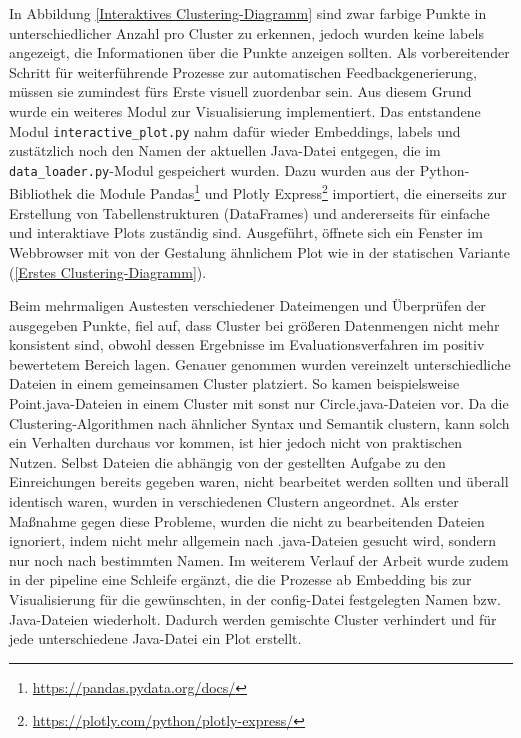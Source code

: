 In Abbildung \ref{Interaktives Clustering-Diagramm} sind zwar farbige Punkte in unterschiedlicher Anzahl pro Cluster zu erkennen, jedoch wurden keine labels angezeigt, die Informationen über die Punkte anzeigen sollten. Als vorbereitender Schritt für weiterführende Prozesse zur automatischen Feedbackgenerierung, müssen sie zumindest fürs Erste visuell zuordenbar sein. Aus diesem Grund wurde ein weiteres Modul zur Visualisierung implementiert. Das entstandene Modul \texttt{interactive\_plot.py} nahm dafür wieder Embeddings, labels und zustätzlich noch den Namen der aktuellen Java-Datei entgegen, die im \texttt{data\_loader.py}-Modul gespeichert wurden. Dazu wurden aus der Python-Bibliothek die Module Pandas\footnote{\url{https://pandas.pydata.org/docs/}} und Plotly Express\footnote{\url{https://plotly.com/python/plotly-express/}} importiert, die einerseits zur Erstellung von Tabellenstrukturen (DataFrames) und andererseits für einfache und interaktiave Plots zuständig sind. Ausgeführt, öffnete sich ein Fenster im Webbrowser mit von der Gestalung ähnlichem Plot wie in der statischen Variante (\ref{Erstes Clustering-Diagramm}).

Beim mehrmaligen Austesten verschiedener Dateimengen und Überprüfen der ausgegeben Punkte, fiel auf, dass Cluster bei größeren Datenmengen nicht mehr konsistent sind, obwohl dessen Ergebnisse im Evaluationsverfahren im positiv bewertetem Bereich lagen. Genauer genommen wurden vereinzelt unterschiedliche Dateien in einem gemeinsamen Cluster platziert. So kamen beispielsweise Point.java-Dateien in einem Cluster mit sonst nur Circle.java-Dateien vor. Da die Clustering-Algorithmen nach ähnlicher Syntax und Semantik clustern, kann solch ein Verhalten durchaus vor kommen, ist hier jedoch nicht von praktischen Nutzen. Selbst Dateien die abhängig von der gestellten Aufgabe zu den Einreichungen bereits gegeben waren, nicht bearbeitet werden sollten und überall identisch waren, wurden in verschiedenen Clustern angeordnet. Als erster Maßnahme gegen diese Probleme, wurden die nicht zu bearbeitenden Dateien ignoriert, indem nicht mehr allgemein nach \glqq.java\grqq-Dateien gesucht wird, sondern nur noch nach bestimmten Namen. Im weiterem Verlauf der Arbeit wurde zudem in der pipeline eine Schleife ergänzt, die die Prozesse ab Embedding bis zur Visualisierung für die gewünschten, in der config-Datei festgelegten Namen bzw. Java-Dateien wiederholt. Dadurch werden gemischte Cluster verhindert und für jede unterschiedene Java-Datei ein Plot erstellt.